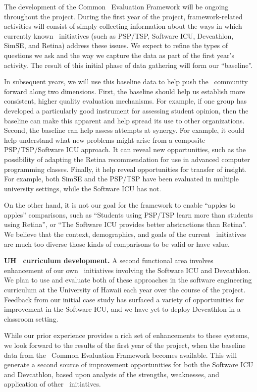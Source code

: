 The development of the Common \eCT\ Evaluation Framework will be ongoing
throughout the project.  During the first year of the project,
framework-related activities will consist of simply collecting information
about the ways in which currently known \eCT\ initiatives (such as PSP/TSP,
Software ICU, Devcathlon, SimSE, and Retina) address these issues.   We expect to 
refine the types of questions we ask and the way we capture the data as
part of the first year's activity. The result of this initial phase of data
gathering will form our ``baseline''. 

In subsequent years, we will use this baseline data to help push the \eCT\
community forward along two dimensions. First, the baseline should help us
establish more consistent, higher quality evaluation mechanisms. For
example, if one group has developed a particularly good instrument for
assessing student opinion, then the baseline can make this apparent and
help spread its use to other organizations.  Second, the baseline can
help assess attempts at synergy.  For example, it could help understand what 
new problems might arise from a composite PSP/TSP/Software ICU approach. 
It can reveal new opportunities, such as the possibility of adapting the 
Retina recommendation for use in advanced computer programming classes. 
Finally, it help reveal opportunities for transfer of insight. For example, 
both SimSE and the PSP/TSP have been evaluated in multiple university settings, 
while the Software ICU has not. 

On the other hand, it is not our goal for the framework to enable ``apples
to apples'' comparisons, such as ``Students using PSP/TSP learn more than
students using Retina'', or ``The Software ICU provides better abstractions
than Retina''.  We believe that the context, demographics, and goals of the
current \eCT\ initiatives are much too diverse those kinds of comparisons
to be valid or have value.


{\bf UH \eCT\ curriculum development.}  A second functional area involves
enhancement of our own \eCT\ initiatives involving the Software ICU and
Devcathlon. We plan to use and evaluate both of these approaches in the
software engineering curriculum at the University of Hawaii each year over
the course of the project.  Feedback from our initial case study
\citep{csdl2-09-02,csdl2-09-03} has surfaced a variety of opportunities for
improvement in the Software ICU, and we have yet to deploy Devcathlon in a
classroom setting.

While our prior experience provides a rich set of enhancements to these
systems, we look forward to the results of the first year of the project,
when the baseline data from the \eCT\ Common Evaluation Framework becomes
available.  This will generate a second source of improvement opportunities
for both the Software ICU and Devcathlon, based upon analysis of the
strengths, weaknesses, and application of other \eCT\ initiatives. 

